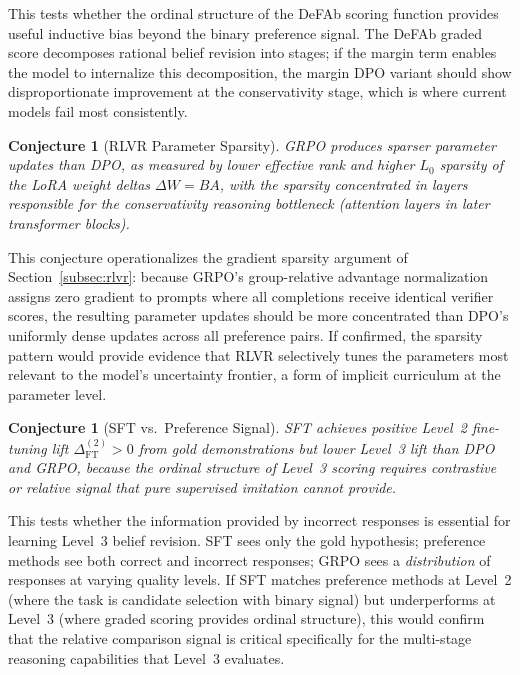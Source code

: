 \documentclass{article}
\newtheorem{conjecture}[theorem]{Conjecture}
\theoremstyle{definition}
\begin{document}
This tests whether the ordinal structure of the DeFAb scoring function provides useful inductive bias beyond the binary preference signal. The DeFAb graded score decomposes rational belief revision into stages; if the margin term enables the model to internalize this decomposition, the margin DPO variant should show disproportionate improvement at the conservativity stage, which is where current models fail most consistently.

\begin{conjecture}[RLVR Parameter Sparsity]\label{conj:sparsity}
GRPO produces sparser parameter updates than DPO, as measured by lower effective rank and higher $L_0$ sparsity of the LoRA weight deltas $\Delta W = BA$, with the sparsity concentrated in layers responsible for the conservativity reasoning bottleneck (attention layers in later transformer blocks).
\end{conjecture}

This conjecture operationalizes the gradient sparsity argument of Section~\ref{subsec:rlvr}: because GRPO's group-relative advantage normalization assigns zero gradient to prompts where all completions receive identical verifier scores, the resulting parameter updates should be more concentrated than DPO's uniformly dense updates across all preference pairs.  If confirmed, the sparsity pattern would provide evidence that RLVR selectively tunes the parameters most relevant to the model's uncertainty frontier, a form of implicit curriculum at the parameter level.

\begin{conjecture}[SFT vs.\ Preference Signal]\label{conj:sft_vs_pref}
SFT achieves positive Level~2 fine-tuning lift $\Delta_{\mathrm{FT}}^{(2)} > 0$ from gold demonstrations but lower Level~3 lift than DPO and GRPO, because the ordinal structure of Level~3 scoring requires contrastive or relative signal that pure supervised imitation cannot provide.
\end{conjecture}

This tests whether the information provided by incorrect responses is essential for learning Level~3 belief revision.  SFT sees only the gold hypothesis; preference methods see both correct and incorrect responses; GRPO sees a \emph{distribution} of responses at varying quality levels.  If SFT matches preference methods at Level~2 (where the task is candidate selection with binary signal) but underperforms at Level~3 (where graded scoring provides ordinal structure), this would confirm that the relative comparison signal is critical specifically for the multi-stage reasoning capabilities that Level~3 evaluates.
\end{document}
